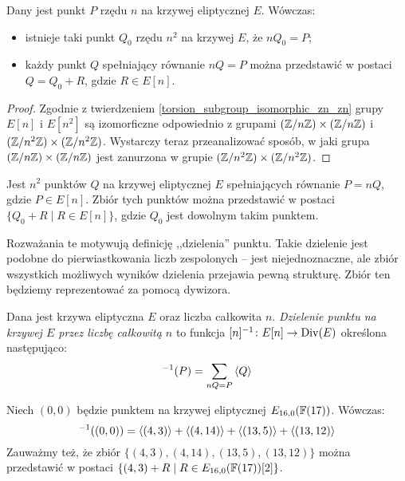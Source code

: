 \begin{theorem}
Dany jest punkt $P$ rzędu $n$ na krzywej eliptycznej $E$.
Wówczas:
\begin{itemize}
\item istnieje taki punkt $Q_0$ rzędu $n^2$ na krzywej $E$, że $nQ_0 = P$;
\item każdy punkt $Q$ spełniający równanie $nQ = P$
można przedstawić w postaci $Q = Q_0 + R$,
gdzie $R \in E[n]$.
\end{itemize}
\end{theorem}

\begin{proof}
Zgodnie z twierdzeniem \ref{torsion_subgroup_isomorphic_zn_zn}
grupy $E[n]$ i $E[n^2]$ są izomorficzne
odpowiednio z grupami
$(\mathbb{Z}/n\mathbb{Z})\times(\mathbb{Z}/n\mathbb{Z})$ i $(\mathbb{Z}/n^2\mathbb{Z})\times(\mathbb{Z}/n^2\mathbb{Z})$.
Wystarczy teraz przeanalizować sposób,
w jaki grupa $(\mathbb{Z}/n\mathbb{Z})\times(\mathbb{Z}/n\mathbb{Z})$
jest zanurzona w grupie $(\mathbb{Z}/n^2\mathbb{Z})\times(\mathbb{Z}/n^2\mathbb{Z})$.
\end{proof}

\begin{corollary}\label{point_division_corollary}
Jest $n^2$ punktów $Q$ na krzywej eliptycznej $E$
spełniających równanie $P = nQ$, gdzie $P \in E[n]$.
Zbiór tych punktów można przedstawić w postaci $\{Q_0 + R \mid R \in E[n]\}$,
gdzie $Q_0$ jest dowolnym takim punktem.
\end{corollary}

\noindent
Rozważania te motywują definicję ,,dzielenia'' punktu.
Takie dzielenie jest podobne do pierwiastkowania liczb zespolonych --
jest niejednoznaczne, ale zbiór wszystkich możliwych wyników dzielenia
przejawia pewną strukturę.
Zbiór ten będziemy reprezentować za pomocą dywizora.

\begin{definition}
Dana jest krzywa eliptyczna $E$
oraz liczba całkowita $n$.
\emph{Dzielenie punktu na krzywej $E$ przez liczbę całkowitą $n$}
to funkcja $[n]^{-1} \colon E[n] \to \operatorname{Div}(E)$
określona następująco:
\begin{equation}
[n]^{-1}(P) = \sum_{nQ = P} \divi{Q}
\end{equation}
\end{definition}

\begin{example}
Niech $(0, 0)$ będzie punktem na krzywej eliptycznej $E_{16,0}(\mathbb{F}(17))$.
Wówczas:
\begin{equation*}
[2]^{-1}((0, 0)) =
    \divi{(4, 3)} + \divi{(4, 14)} + \divi{(13, 5)} + \divi{(13, 12)}
\end{equation*}
Zauważmy też, że zbiór $\{(4, 3), (4, 14), (13, 5), (13, 12)\}$
można przedstawić w postaci
\linebreak $\{(4, 3) + R \mid R \in E_{16,0}(\mathbb{F}(17))[2]\}$.
\end{example}

